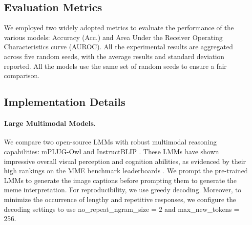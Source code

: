 \subsection{Evaluation Metrics}

We employed two widely adopted metrics to evaluate the performance of the various models: Accuracy (Acc.) and Area Under the Receiver Operating Characteristics curve (AUROC). All the experimental results are aggregated across five random seeds, with the average results and standard deviation reported. All the models use the same set of random seeds to ensure a fair comparison.


\subsection{Implementation Details}
\paragraph{Large Multimodal Models.} 

We compare two open-source LMMs with robust multimodal reasoning capabilities: mPLUG-Owl \cite{ye2023mplug} and InstructBLIP \cite{dai2023instructblip}. These LMMs have shown impressive overall visual perception and cognition abilities, as evidenced by their high rankings on the MME benchmark leaderboards \cite{fu2023mme}. We prompt the pre-trained LMMs to generate the image captions before prompting them to generate the meme interpretation. For reproducibility, we use greedy decoding. Moreover, to minimize the occurrence of lengthy and repetitive responses, we configure the decoding settings to use no\_repeat\_ngram\_size = 2 and max\_new\_tokens = 256.

